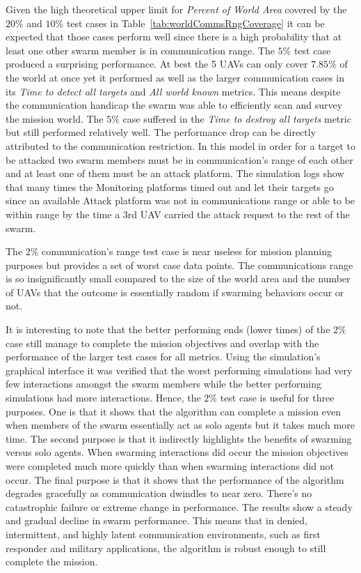 Given the high theoretical upper limit for \textit{Percent of World Area} covered by the $20\%$ and $10\%$ test cases in Table~\ref{tab:worldCommsRngCoverage} it can be expected that those cases perform well since there is a high probability that at least one other swarm member is in communication range.  The $5\%$ test case produced a surprising performance.  At best the 5 UAVs can only cover $7.85\%$ of the world at once yet it performed as well as the larger communication cases in its \textit{Time to detect all targets} and \textit{All world known} metrics.  This means despite the communication handicap the swarm was able to efficiently scan and survey the mission world.  The $5\%$ case suffered in the \textit{Time to destroy all targets} metric but still performed relatively well.  The performance drop can be directly attributed to the communication restriction.  In this model in order for a target to be attacked two swarm members must be in communication's range of each other and at least one of them must be an attack platform.  The simulation logs show that many times the Monitoring platforms timed out and let their targets go since an available Attack platform was not in communications range or able to be within range by the time a 3rd UAV carried the attack request to the rest of the swarm.

The $2\%$ communication's range test case is near useless for mission planning purposes but provides a set of worst case data points.  The communications range is so insignificantly small compared to the size of the world area and the number of UAVs that the outcome is essentially random if swarming behaviors occur or not. %

It is interesting to note that the better performing ends (lower times) of the $2\%$ case still manage to complete the mission objectives and overlap with the performance of the larger test cases for all metrics. Using the simulation's graphical interface it was verified that the worst performing simulations had very few interactions amongst the swarm members while the better performing simulations had more interactions.  Hence, the $2\%$ test case is useful for three purposes.  One is that it shows that the algorithm can complete a mission even when members of the swarm essentially act as solo agents but it takes much more time.  The second purpose is that it indirectly highlights the benefits of swarming versus solo agents.  When swarming interactions did occur the mission objectives were completed much more quickly than when swarming interactions did not occur.  The final purpose is that it shows that the performance of the algorithm degrades gracefully as communication dwindles to near zero.  There's no catastrophic failure or extreme change in performance.  The results show a steady and gradual decline in swarm performance.  This means that in denied, intermittent, and highly latent communication environments, such as first responder and military applications, the algorithm is robust enough to still complete the mission.

